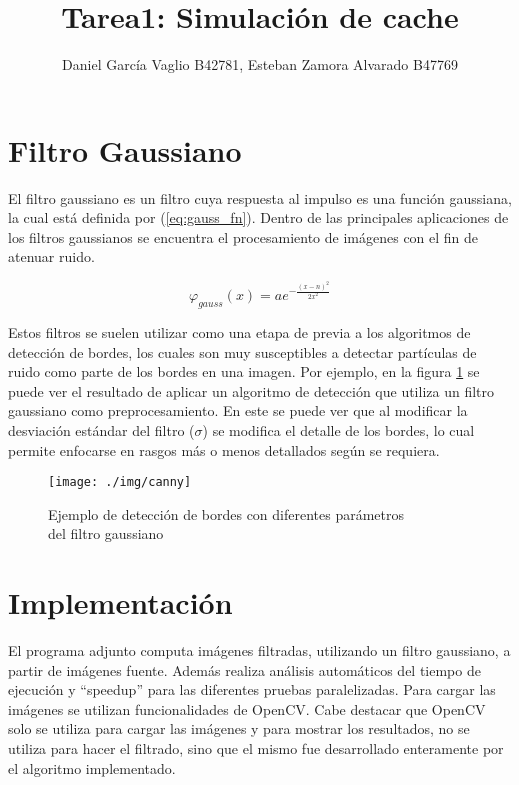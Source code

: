 \documentclass {article}
\begin{document}
\title{Tarea1: Simulación de cache}
\author{Daniel García Vaglio B42781, Esteban Zamora Alvarado B47769}

\maketitle


\section{Filtro Gaussiano}

El filtro gaussiano es un filtro cuya respuesta al impulso es una función gaussiana, la cual está
definida por (\ref{eq:gauss_fn}). Dentro de las principales aplicaciones de los filtros gaussianos
se encuentra el procesamiento de imágenes con el fin de atenuar ruido. 

\begin{equation}
  \varphi_{gauss}(x)=ae^{-\frac{(x-n)^2}{2x^2}}
  \label{eq:gauss_fn}
\end{equation}

Estos filtros se suelen utilizar como una etapa de previa a los algoritmos de detección de bordes,
los cuales son muy susceptibles a detectar partículas de ruido como parte de los bordes en una
imagen. Por ejemplo, en la figura \ref{fig:canny} se puede ver el resultado de aplicar un algoritmo
de detección que utiliza un filtro gaussiano como preprocesamiento. En este se puede ver que al
modificar la desviación estándar del filtro ($\sigma$) se modifica el detalle de los bordes, lo cual
permite enfocarse en rasgos más o menos detallados según se requiera.

\begin{figure}[ht]
  \centering
  \texttt{[image: ./img/canny]}
  \caption{\label{fig:canny}Ejemplo de detección de bordes con diferentes parámetros \\del filtro gaussiano}
\end{figure}




\section{Implementación}

El programa adjunto computa imágenes filtradas, utilizando un filtro gaussiano, a partir de imágenes
fuente. Además realiza análisis automáticos del tiempo de ejecución y ``speedup'' para las
diferentes pruebas paralelizadas. Para cargar las imágenes se utilizan funcionalidades de
OpenCV. Cabe destacar que OpenCV solo se utiliza para cargar las imágenes y para mostrar los
resultados, no se utiliza para hacer el filtrado, sino que el mismo fue desarrollado enteramente por
el algoritmo implementado.
\end{document}

